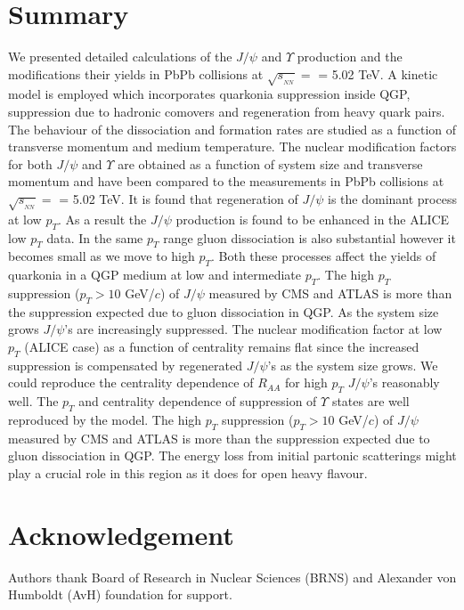 \documentclass[12pt,a4paper,final]{iopart} %
\newcommand{\Jpsi}{J/\psi}
\newcommand{\pT}{p_{T}}
\newcommand{\sNN}{\sqrt{s_{_{NN}}}}
\begin{document}
\section{Summary}
 We presented detailed calculations of the $\Jpsi$ and $\Upsilon$ 
production and the modifications their yields in PbPb collisions at $\sNN =$ = 5.02 TeV.
A kinetic model is employed which incorporates quarkonia suppression inside QGP, suppression 
due to hadronic comovers and regeneration from heavy quark pairs.
The behaviour of the dissociation and formation rates are studied as a function of
transverse momentum and medium temperature. 
The nuclear modification factors for both $\Jpsi$ and $\Upsilon$ are obtained 
as a function of system size and transverse momentum and have been compared to the measurements
in PbPb collisions at $\sNN =$ = 5.02 TeV.
It is found that  regeneration of $\Jpsi$ is the dominant process at low $p_T$. As a result the $\Jpsi$ production 
is found to be enhanced in the ALICE low $p_T$ data.
In the same $p_T$ range gluon dissociation is also substantial however it becomes small
as we move to high $p_T$. 
 Both  these processes affect the 
yields of quarkonia in a QGP medium  at low and intermediate $p_T$. The high $p_T$ 
suppression ($p_T > 10$  GeV/$c$) of $\Jpsi$ measured by CMS and ATLAS is more than
the suppression expected due to gluon dissociation in QGP.
As the system size grows  $\Jpsi$'s are increasingly suppressed.  The nuclear 
modification factor at low $p_T$  (ALICE case) as a function of centrality remains
flat since the increased suppression is compensated by regenerated  $\Jpsi$'s
as the system size grows. 
We could reproduce the centrality dependence of $R_{AA}$ for high $p_T$ $\Jpsi$'s reasonably
well. The $\pT$ and centrality dependence of suppression of $\Upsilon$ states are well reproduced
by the model. The high $\pT$ suppression ($p_T > 10$  GeV/$c$) of $\Jpsi$ measured by CMS and
ATLAS is more than the suppression expected due to gluon dissociation in QGP.
The energy loss from initial partonic scatterings might play a crucial role in this region
as it does for open heavy flavour.


\section{Acknowledgement}
Authors thank Board of Research in Nuclear Sciences (BRNS) and Alexander von Humboldt (AvH)
foundation for support. 

%
%
\end{document}
